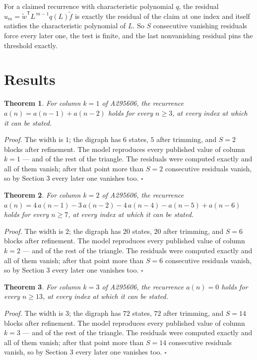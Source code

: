 \documentclass[11pt]{article}
\newtheorem{theorem}{Theorem}
\theoremstyle{definition}
\begin{document}
For a claimed recurrence with characteristic polynomial $q$, the residual $u_m = \tilde w^{\mathsf T}L^{\,m-1}q(L)\tilde f$ is exactly the residual of the claim at one index and itself satisfies the characteristic polynomial of $L$. So $S$ consecutive vanishing residuals force every later one, the test is finite, and the last nonvanishing residual pins the threshold exactly.

\section{Results}

\begin{theorem} For column $k = 1$ of A295606, the recurrence $a(n) = a(n-1) + a(n-2)$ holds for every $n \ge 3$, at every index at which it can be stated.\end{theorem}

{\itshape Proof.} The width is $1$; the digraph has $6$ states, $5$ after trimming, and $S = 2$ blocks after refinement. The model reproduces every published value of column $k = 1$ --- and of the rest of the triangle. The residuals were computed exactly and all of them vanish; after that point more than $S = 2$ consecutive residuals vanish, so by Section 3 every later one vanishes too. $\square$

\begin{theorem} For column $k = 2$ of A295606, the recurrence $a(n) = 4\,a(n-1) - 3\,a(n-2) - 4\,a(n-4) - a(n-5) + a(n-6)$ holds for every $n \ge 7$, at every index at which it can be stated.\end{theorem}

{\itshape Proof.} The width is $2$; the digraph has $20$ states, $20$ after trimming, and $S = 6$ blocks after refinement. The model reproduces every published value of column $k = 2$ --- and of the rest of the triangle. The residuals were computed exactly and all of them vanish; after that point more than $S = 6$ consecutive residuals vanish, so by Section 3 every later one vanishes too. $\square$

\begin{theorem} For column $k = 3$ of A295606, the recurrence $a(n) = 0$ holds for every $n \ge 13$, at every index at which it can be stated.\end{theorem}

{\itshape Proof.} The width is $3$; the digraph has $72$ states, $72$ after trimming, and $S = 14$ blocks after refinement. The model reproduces every published value of column $k = 3$ --- and of the rest of the triangle. The residuals were computed exactly and all of them vanish; after that point more than $S = 14$ consecutive residuals vanish, so by Section 3 every later one vanishes too. $\square$
\end{document}
